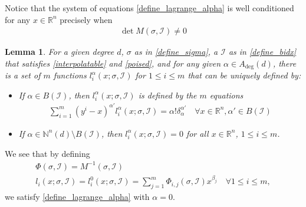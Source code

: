 \documentclass{article}
\newtheorem{lemma}[theorem]{Lemma}
\theoremstyle{case}
\newcommand{\naturals}{\mathbb N}
\newcommand{\natsn}{\naturals^n}
\newcommand{\Rn}{\mathbb R^n}
\newcommand{\Adeg}{{A_{\textrm{deg}}}}
\newcommand{\bidx}{{\mathcal I}}
\newcommand{\bsub}{{B(\bidx)}}
\newcommand{\ridx}{{\mathcal I^e}}
\begin{document}
Notice that the system of equations \cref{define_lagrange_alpha} is well conditioned for any $x \in \Rn$ precisely when
\begin{align}
\det M(\sigma, \bidx) \ne 0 \label{poised}
\end{align}


\begin{lemma}
\label{lagrange_are_unique}
For a given degree $d$, $\sigma$ as in \cref{define_sigma}, a $\bidx$ as in \cref{define_bidx} that satisfies \cref{interpolatable} and \cref{poised}, 
and for any given $\alpha \in \Adeg(d)$,
there is a set of $m$ functions $l^{\alpha}_i(x; \sigma, \bidx)$ for $1 \le i \le m$ that can be uniquely defined by:
\begin{itemize}
\item If $\alpha \in \bsub$, then $l^{\alpha}_i(x; \sigma, \bidx)$ is defined by the $m$ equations
\begin{align}
\sum_{i = 1}^m (y^i - x)^{\alpha'}l^{\alpha}_i(x; \sigma, \bidx) = \alpha! \delta_{\alpha}^{\alpha'} \quad \forall x\in\Rn,\alpha' \in \bsub \label{define_lagrange_alpha}
\end{align}
\item If $\alpha \in \natsn(d) \setminus \bsub$, then $l^{\alpha}_i(x; \sigma, \bidx) = 0$ for all $x \in \Rn$, $1 \le i \le m$.
\end{itemize}
\end{lemma}


We see that by defining
\begin{align*}
\Phi(\sigma, \bidx) = M^{-1}(\sigma, \bidx) \\
l_i(x; \sigma, \bidx) = l^{0}_i(x; \sigma, \bidx) = \sum_{j=1}^m \Phi_{i, j}(\sigma, \bidx) x^{\beta_j} \quad \forall 1 \le i \le m,
\end{align*}
we satisfy \cref{define_lagrange_alpha} with $\alpha = 0$.


\end{document}
